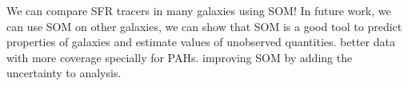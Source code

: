 We can compare SFR tracers in many galaxies using SOM!
In future work, we can use SOM on other galaxies, 
we can show that SOM is a good tool to predict properties of galaxies and estimate values of unobserved quantities.
better data with more coverage specially for PAHs.
improving SOM by adding the uncertainty to analysis.






